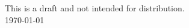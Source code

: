 \documentclass[twocolumn]{bmcart}%
\begin{document}
\begin{frontmatter}
\begin{fmbox}
\begin{artnotes}
\end{artnotes}

\end{fmbox}%


\begin{abstractbox}

This is a draft and not intended for distribution. \\
\today

\end{abstractbox}
%

\end{frontmatter}



%

\end{document}

